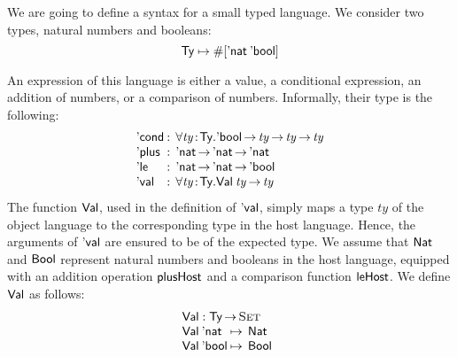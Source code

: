 \newcommand{\SYMBEval}{\etag{\CN{val}}\xspace}
\newcommand{\Eval}[1]{\SYMBEval\:#1}
\newcommand{\SYMBEcond}{\etag{\CN{cond}}\xspace}
\newcommand{\Econd}[3]{\SYMBEcond\:#1\:#2\:#3}
\newcommand{\SYMBEplus}{\etag{\CN{plus}}\xspace}
\newcommand{\Eplus}[2]{\SYMBEplus\:#1\:#2}
\newcommand{\SYMBEle}{\etag{\CN{le}}\xspace}
\newcommand{\Ele}[2]{\SYMBEle\:#1\:#2}

\newcommand{\SYMBVal}{\F{Val}\xspace}
\newcommand{\Val}[1]{\SYMBVal\:#1}
\newcommand{\SYMBVar}{\F{Var}\xspace}
\newcommand{\Var}[2]{\SYMBVar\: #1\: #2}

\newcommand{\HExprD}{\C{ExprD}}
\newcommand{\HExprAD}{\C{ExprAD}}
\newcommand{\HExprID}{\C{ExprID}}
\newcommand{\HExprVarD}[1]{\C{ExprD}_{\F{Var},#1}}
\newcommand{\HExprFreeD}{\C{ExprD}^{\C{Free}}}
\newcommand{\HExprAFreeD}{\C{ExprAD}^{\C{Free}}}

We are going to define a syntax for a small typed language. We
consider two types, natural numbers and booleans:
%
\[
\Ty \mapsto \EnumT{\sqr{\Enat\: \Ebool}}
\]

An expression of this language is either a value, a conditional
expression, an addition of numbers, or a comparison of
numbers. Informally, their type is the following:
%
\[
\begin{array}{l@{\::\:\:}l}
\SYMBEcond           & \forall \Bhab{\V{ty}}{\Ty} . \Ebool \To \V{ty} \To \V{ty} \To \V{ty}  \\ 
\SYMBEplus           & \Enat \To \Enat \To \Enat                           \\
\SYMBEle             & \Enat \To \Enat \To \Ebool                          \\
\SYMBEval            & \forall \Bhab{\V{ty}}{\Ty} . \Val{\V{ty}} \To \V{ty}
\end{array}
\]
%
The function $\SYMBVal$, used in the definition of $\SYMBEval$, simply
maps a type $ty$ of the object language to the corresponding type in
the host language. Hence, the arguments of $\SYMBEval$ are ensured to
be of the expected type. We assume that $\Nat$ and $\Bool$ represent
natural numbers and booleans in the host language, equipped with an
addition operation $\F{plusHost}$ and a comparison function
$\F{leHost}$. We define $\SYMBVal$ as follows:
%
\[\stk{
\SYMBVal : \Ty \To \Set \\
\begin{array}{@{}l@{\:\mapsto\:\:}l}
\Val{\Enat}   & \Nat \\
\Val{\Ebool}  & \Bool
\end{array}
}\]

